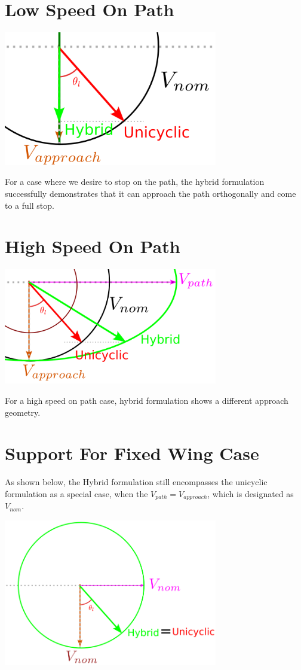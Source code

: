 \documentclass[10pt,twoside,a4paper]{report}
\begin{document}
\section{Low Speed On Path}

\includegraphics[width=0.7\textwidth]{VPath_0}

For a case where we desire to stop on the path, the hybrid formulation successfully demonstrates that it can approach the path orthogonally and come to a full stop.

\section{High Speed On Path}

\includegraphics[width=0.7\textwidth]{VPath_High}

For a high speed on path case, hybrid formulation shows a different approach geometry.

\section{Support For Fixed Wing Case}

As shown below, the Hybrid formulation still encompasses the unicyclic formulation as a special case, when the $V_{path} = V_{approach}$, which is designated as $V_{nom}$.

\includegraphics[width=0.7\textwidth]{Hybrid_Supporting_Unicyclic}
\end{document}
